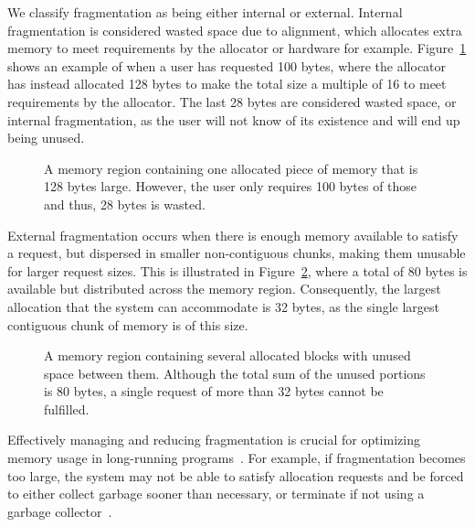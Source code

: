 
We classify fragmentation as being either internal or external. Internal fragmentation is considered wasted space due to alignment, which allocates extra memory to meet requirements by the allocator or hardware for example. Figure~\ref{fig:internal_fragmentation} shows an example of when a user has requested 100 bytes, where the allocator has instead allocated 128 bytes to make the total size a multiple of 16 to meet requirements by the allocator. The last 28 bytes are considered wasted space, or internal fragmentation, as the user will not know of its existence and will end up being unused.

\begin{figure}[H]
    \centering
    \vspace*{0.2cm}
    
    \vspace*{0.2cm}
    \caption{A memory region containing one allocated piece of memory that is 128 bytes large. However, the user only requires 100 bytes of those and thus, 28 bytes is wasted.}
    \label{fig:internal_fragmentation}
\end{figure}

External fragmentation occurs when there is enough memory available to satisfy a request, but dispersed in smaller non-contiguous chunks, making them unusable for larger request sizes. This is illustrated in Figure~\ref{fig:external_fragmentation}, where a total of 80 bytes is available but distributed across the memory region. Consequently, the largest allocation that the system can accommodate is 32 bytes, as the single largest contiguous chunk of memory is of this size.

\begin{figure}[H]
    \centering
    \vspace*{0.2cm}
    \hspace*{1.2cm}
    
    \vspace*{0.2cm}
    \caption{A memory region containing several allocated blocks with unused space between them. Although the total sum of the unused portions is 80 bytes, a single request of more than 32 bytes cannot be fulfilled.}
    \label{fig:external_fragmentation}
\end{figure}

Effectively managing and reducing fragmentation is crucial for optimizing memory usage in long-running programs~\cite{gchandbook}. For example, if fragmentation becomes too large, the system may not be able to satisfy allocation requests and be forced to either collect garbage sooner than necessary, or terminate if not using a garbage collector~\cite{gchandbook}.

